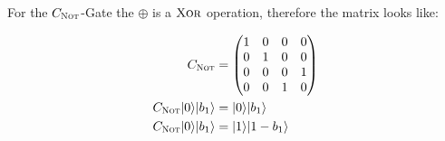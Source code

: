 \documentclass[bibliography=totocnumbered, 10pt]{article}
\theoremstyle{NoticeStyle}
\begin{document}
For the $C_\textsc{Not}$-Gate the $\oplus$ is a $\textsc{Xor}$ operation, therefore the matrix looks like:

\begin{align}
	C_\textsc{Not} & = 
		\begin{pmatrix}
			1 &  0 &  0 &  0\\
			0 &  1 &  0 &  0\\
			0 &  0 &  0 &  1\\
			0 &  0 &  1 &  0\\
		\end{pmatrix}\\
	C_\textsc{Not} {\left\vert{0}\right\rangle}{\left\vert{b_1}\right\rangle} & = {\left\vert{0}\right\rangle}{\left\vert{b_1}\right\rangle}\\
	C_\textsc{Not} {\left\vert{0}\right\rangle}{\left\vert{b_1}\right\rangle} & = {\left\vert{1}\right\rangle}{\left\vert{1-b_1}\right\rangle}
\end{align}
\end{document}
